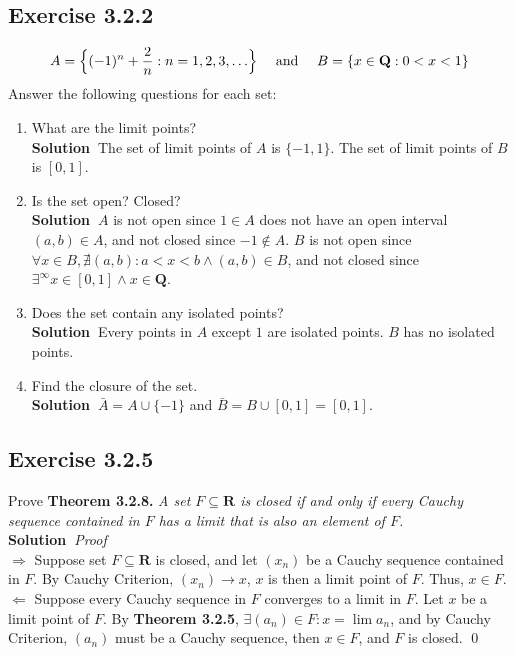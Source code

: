 \documentclass[12pt]{report}
\newcommand{\sol}{{\textbf{Solution~}}}
\begin{document}
\subsection*{Exercise 3.2.2}
\begin{align*}
    A = \Bigl\{(-1)^n +\frac{2}{n}:n= 1,2,3,\ldots\Bigr\} \text{~~~~and~~~~} B=\{x\in \mathbf{Q}:0<x<1\}
\end{align*}
Answer the following questions for each set:
\begin{enumerate}[label=(\alph*)]
    \item What are the limit points?\\
    \sol The set of limit points of $A$ is $\{-1,1\}$. The set of limit points of $B$ is $[0,1]$.
    \item Is the set open? Closed?\\
    \sol $A$ is not open since $1\in A$ does not have an open interval $(a,b)\in A$, and not closed since $-1 \notin A$. 
    $B$ is not open since $\forall x \in B, \nexists (a,b) : a<x<b \land (a,b)\in B$, and not closed since $\exists^{\infty} x \in [0,1] \land x \in \mathbf{Q}$.
    \item Does the set contain any isolated points?\\
    \sol Every points in $A$ except $1$ are isolated points. $B$ has no isolated points.
    \item Find the closure of the set.\\
    \sol $\bar{A}=A \cup \{-1\}$ and $\bar{B}= B \cup [0,1] = [0,1]$.
\end{enumerate}
\subsection*{Exercise 3.2.5}
Prove \textbf{Theorem 3.2.8.} \textit{A set $F \subseteq \mathbf{R}$ is closed if and only if every Cauchy sequence contained 
in $F$ has a limit that is also an element of $F$.}\\
\sol \textit{Proof} \\
$\Rightarrow$ Suppose set $F \subseteq \mathbf{R}$ is closed, and let $(x_n)$ be a Cauchy sequence contained in $F$. 
By Cauchy Criterion, $(x_n)\to x$, $x$ is then a limit point of $F$. Thus, $x \in F$.\\
$\Leftarrow$ Suppose every Cauchy sequence in $F$ converges to a limit in $F$. Let $x$ be a limit point of $F$. 
By \textbf{Theorem 3.2.5}, $\exists (a_n) \in F: x=\lim a_n$, and by Cauchy Criterion, $(a_n)$ must be a Cauchy sequence, 
then $x \in F$, and $F$ is closed. \qed
\end{document}
